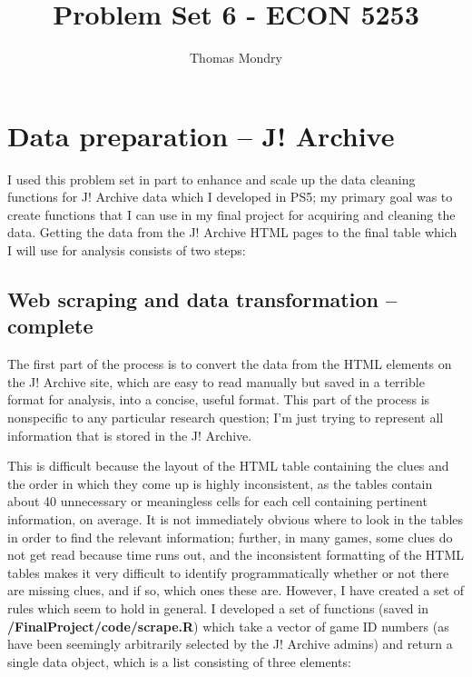 \documentclass{article}
\title{Problem Set 6 - ECON 5253}
\author{Thomas Mondry}
\begin{document}
\maketitle

\section{Data preparation -- J! Archive}

I used this problem set in part to enhance and scale up the data cleaning functions for J! Archive data which I developed in PS5; my primary goal was to create functions that I can use in my final project for acquiring and cleaning the data. Getting the data from the J! Archive HTML pages to the final table which I will use for analysis consists of two steps:

\subsection{Web scraping and data transformation -- complete}

The first part of the process is to convert the data from the HTML elements on the J! Archive site, which are easy to read manually but saved in a terrible format for analysis, into a concise, useful format. This part of the process is nonspecific to any particular research question; I'm just trying to represent all information that is stored in the J! Archive.

This is difficult because the layout of the HTML table containing the clues and the order in which they come up is highly inconsistent, as the tables contain about 40 unnecessary or meaningless cells for each cell containing pertinent information, on average. It is not immediately obvious where to look in the tables in order to find the relevant information; further, in many games, some clues do not get read because time runs out, and the inconsistent formatting of the HTML tables makes it very difficult to identify programmatically whether or not there are missing clues, and if so, which ones these are. However, I have created a set of rules which seem to hold in general. I developed a set of functions (saved in \textbf{/FinalProject/code/scrape.R}) which take a vector of game ID numbers (as have been seemingly arbitrarily selected by the J! Archive admins) and return a single data object, which is a list consisting of three elements:
\end{document}
